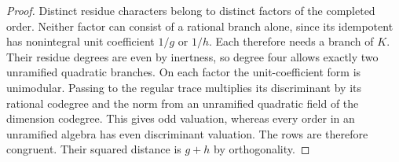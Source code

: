 \documentclass[11pt,reqno]{amsart}
\theoremstyle{remark}\newtheorem{remark}[theorem]{Remark}
\numberwithin{equation}{section}
\begin{document}
\begin{proof}
Distinct residue characters belong to distinct factors of the
completed order. Neither factor can consist of a rational branch
alone, since its idempotent has nonintegral unit coefficient $1/g$
or $1/h$. Each therefore needs a branch of $K$. Their residue degrees are even
by inertness, so degree four allows exactly two unramified quadratic branches. On each
factor the unit-coefficient form is unimodular. Passing to the
regular trace multiplies its discriminant by its rational codegree
and the norm from an unramified quadratic field of the dimension
codegree. This gives odd valuation, whereas every order in an
unramified algebra has even discriminant valuation. The rows are
therefore congruent. Their squared distance is $g+h$ by orthogonality.
\end{proof}
\end{document}
